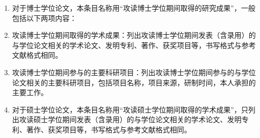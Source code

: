 \achievement
\begin{enumerate}[leftmargin =0.7cm]
\renewcommand{\labelenumi}{[\theenumi]}
\item
对于博士学位论文，本条目名称用“攻读博士学位期间取得的研究成果”，一般包括以下两项内容：
\item
攻读博士学位期间取得的学术成果：列出攻读博士学位期间发表（含录用）的与学位论文相关的学术论文、发明专利、著作、获奖项目等，书写格式与参考文献格式相同。
\item
攻读博士学位期间参与的主要科研项目：列出攻读博士学位期间参与的与学位论文相关的主要科研项目，包括项目名称，项目来源，研制时间，本人承担的主要工作。
\item
对于硕士学位论文，本条目名称用“攻读硕士学位期间取得的学术成果”，只列出攻读硕士学位期间发表（含录用）的与学位论文相关的学术论文、发明专利、著作、获奖项目等，书写格式与参考文献格式相同。
\end{enumerate}
